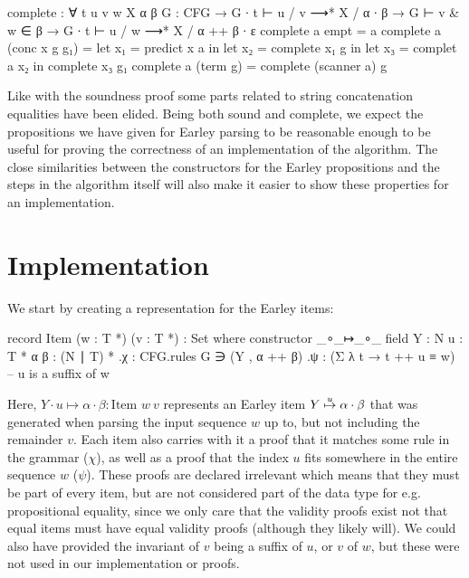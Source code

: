 		\begin{code}
			complete : ∀ {t u v w X α β} {G : CFG} →
			  G ∙ t ⊢ u / v ⟶* X / α ∙ β →
			  G ⊢ v & w ∈ β →
			    G ∙ t ⊢ u / w ⟶* X / α ++ β ∙ ε
			complete a empt = a
			complete a (conc x g g₁) =
			  let x₁ = predict x a in
			  let x₂ = complete x₁ g in
			  let x₃ = complet a x₂ in
			  complete x₃ g₁
			complete a (term g) = complete (scanner a) g
		\end{code}

		Like with the soundness proof some parts related to string
		concatenation equalities have been elided. Being both sound and
		complete, we expect the propositions we have given for Earley parsing
		to be reasonable enough to be useful for proving the correctness of an
		implementation of the algorithm. The close similarities between the
		constructors for the Earley propositions and the steps in the algorithm
		itself will also make it easier to show these properties for an
		implementation.

	\section{Implementation}

		We start by creating a representation for the Earley items:

		\begin{code}
			record Item (w : T *) (v : T *) : Set where
			  constructor _∘_↦_∘_
			  field
			    Y : N
			    u : T *
			    α β : (N ∣ T) *
			    .{χ} : CFG.rules G ∋ (Y , α ++ β)
			    .{ψ} : (Σ λ t → t ++ u ≡ w)        -- u is a suffix of w
		\end{code}

		Here, $Y \cdot u \mapsto \alpha \cdot \beta : \textrm{Item } w\ v$
		represents an Earley item $Y\overset{u}{\mapsto}\alpha\cdot\beta$ that was
		generated when parsing the input sequence $w$ up to, but not including
		the remainder $v$. Each item also carries with it a proof that it
		matches some rule in the grammar ($\chi$), as well as a proof that the
		index $u$ fits somewhere in the entire sequence $w$ ($\psi$). These
		proofs are declared irrelevant which means that they must be part of
		every item, but are not considered part of the data type for e.g.
		propositional equality, since we only care that the validity proofs
		exist not that equal items must have equal validity proofs (although
		they likely will). We could also have provided the invariant of $v$
		being a suffix of $u$, or $v$ of $w$, but these were not used in our
		implementation or proofs.

